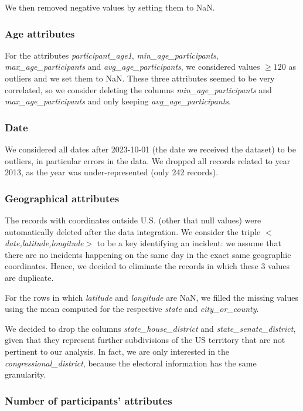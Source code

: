 \documentclass[11pt,a4paper]{report}
\begin{document}
We then removed negative values by setting them to NaN.

\subsubsection{Age attributes}

For the attributes \textit{participant\_age1}, \textit{min\_age\_participants}, \textit{max\_age\_participants} and \textit{avg\_age\_participants}, we considered values $\ge 120$ as outliers and we set them to NaN.
These three attributes seemed to be very correlated, so we consider deleting the columns \textit{min\_age\_participants} and \textit{max\_age\_participants} and only keeping \textit{avg\_age\_participants}.

\subsubsection{Date}

We considered all dates after 2023-10-01 (the date we received the dataset) to be outliers, in particular errors in the data.
We dropped all records related to year 2013, as the year was under-represented (only 242 records).

\subsubsection{Geographical attributes}

The records with coordinates outside U.S. (other that null values) were automatically deleted after the data integration.
We consider the triple \textit{$<$date,latitude,longitude$>$} to be a key identifying an incident: we assume that there are no incidents happening on the same day in the exact same geographic coordinates.
Hence, we decided to eliminate the records in which these 3 values are duplicate.

For the rows in which \textit{latitude} and \textit{longitude} are NaN, we filled the missing values using the mean computed for the respective \textit{state} and \textit{city\_or\_county}.

We decided to drop the columns \textit{state\_house\_district} and \textit{state\_senate\_district}, given that they represent further subdivisions of the US territory that are not pertinent to our analysis.
In fact, we are only interested in the \textit{congressional\_district}, because the electoral information has the same granularity.

\subsubsection{Number of participants' attributes}
\end{document}
